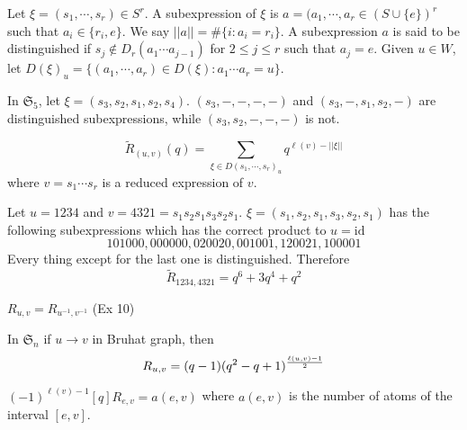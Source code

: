 \begin{definition}
	Let $\xi=(s_1,\cdots,s_r)\in S^r$. A subexpression of $\xi$ is $a=(a_1,\cdots,a_r\in (S\cup \{e\})^r$ such that $a_i\in\{r_i,e\}$. We say $||a||=\#\{i:a_i=r_i\}$. A subexpression $a$ is said to be distinguished if
	\(s_j\notin D_r(a_1\cdots a_{j-1})\) for $2 \leq j \leq r$ such that $a_j = e$. Given $u\in W$, let $D(\xi)_u=\{(a_1,\cdots,a_r)\in D(\xi):a_1\cdots a_r=u\}$.
	\end{definition}
	\begin{example}
		In $\mathfrak{S}_5$, let $\xi=(s_3,s_2,s_1,s_2,s_4)$. $(s_3,-,-,-,-)$ and $(s_3,-,s_1,s_2,-)$ are distinguished subexpressions, while $(s_3,s_2,-,-,-)$ is not.
	\end{example}
\begin{theorem}\label{thm:R-formula}
	\[\tilde R_{(u,v)}(q)=\sum_{\xi \in D(s_1,\cdots,s_r)_u}q^{\ell(v)-||\xi||}\]
	where $v=s_1\cdots s_r$ is a reduced expression of $v$.
\end{theorem}
\begin{example}
	Let $u=1234$ and $v=4321=s_1s_2s_1s_3s_2s_1$.
	$\xi=(s_1,s_2,s_1,s_3,s_2,s_1)$ has the following subexpressions which has the correct product to $u=\text{id}$
	\[101000,000000,020020,001001,120021,100001\]
	Every thing except for the last one is distinguished. Therefore
	\[\tilde R_{1234,4321}=q^6+3q^4+q^2\]
\end{example}
\begin{exercise}
	$R_{u,v}=R_{u^{-1},v^{-1}}$ (Ex 10)
\end{exercise}
\begin{exercise}
	In $\mathfrak{S}_n$ if $u\to v$ in Bruhat graph, then
	\[R_{u,v}=(q-1)(q^2-q+1)^{\ell(u,v)-1\over 2}\]
\end{exercise}
\begin{exercise}
	$(-1)^{\ell(v)-1}[q]R_{e,v}=a(e,v)$ where $a(e,v)$ is the number of atoms of the interval $[e,v]$.
\end{exercise}

